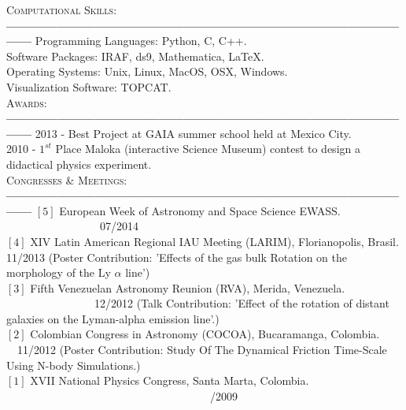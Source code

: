 \documentclass[letterpaper]{article}
\begin{document}
\textsc{\Large Computational Skills}:\\
{\bf---------------------------------------------------------------------------------------------------}
Programming Languages: Python, C, C++.\\
Software Packages: IRAF, ds9, Mathematica, \LaTeX.\\
Operating Systems: Unix, Linux, MacOS, OSX, Windows.\\
Visualization Software: TOPCAT.\\

\textsc{\Large Awards:}\\
{\bf---------------------------------------------------------------------------------------------------}
2013 - Best Project at GAIA summer school held at Mexico City.\\
2010 - $1^{st}$ Place Maloka (interactive Science Museum) contest to design a didactical physics experiment.\\ 

\textsc{\Large Congresses \& Meetings:}\\
{\bf---------------------------------------------------------------------------------------------------}
$\left[5\right]$ European Week of Astronomy and Space Science EWASS.  \indent \ \ \ \ \ \ \ \ \ \ \ \ \ \ \ \ \ 07/2014 \\
$\left[4\right]$ XIV Latin American Regional IAU Meeting (LARIM), Florianopolis, Brasil.  11/2013
\normalsize {(Poster Contribution: 'Effects of the gas bulk Rotation on the morphology of the Ly $\alpha$ line')}\\
$\left[3\right]$\large{ Fifth Venezuelan Astronomy Reunion (RVA), Merida, Venezuela. \indent \ \ \ \  \ \ \ \ \ \ \ \ \ \ \ \ 12/2012}
\normalsize{(Talk Contribution: 'Effect of the rotation of distant galaxies on the Lyman-alpha emission line'.)}\\
$\left[2\right]$\large{ Colombian Congress in Astronomy (COCOA), Bucaramanga, Colombia. \indent \ \ 11/2012} 
\normalsize{(Poster Contribution: Study Of The Dynamical Friction Time-Scale Using N-body Simulations.)}\\
$\left[1\right]$\large{ XVII National Physics Congress, Santa Marta, Colombia. \indent \ \ \ \ \ \ \ \ \ \ \ \ \ \ \ \ \  \ \ \ \ \ \ \ \ \ \ \ \ \ \ \ \ \ \ \ \   /2009}\\
\end{document}
